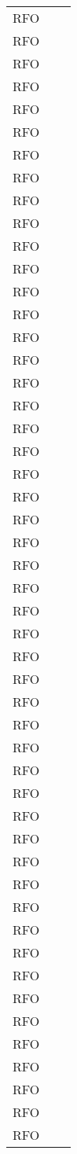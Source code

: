 \begin{table}
\begin{tabularx}{\textwidth}{lXl}
RFO &  & \\
RFO &  & \\
RFO &  & \\
RFO &  & \\
RFO &  & \\
RFO &  & \\
RFO &  & \\
RFO &  & \\
RFO &  & \\
RFO &  & \\
RFO &  & \\
RFO &  & \\
RFO &  & \\
RFO &  & \\
RFO &  & \\
RFO &  & \\
RFO &  & \\
RFO &  & \\
RFO &  & \\
RFO &  & \\
RFO &  & \\
RFO &  & \\
RFO &  & \\
RFO &  & \\
RFO &  & \\
RFO &  & \\
RFO &  & \\
RFO &  & \\
RFO &  & \\
RFO &  & \\
RFO &  & \\
RFO &  & \\
RFO &  & \\
RFO &  & \\
RFO &  & \\
RFO &  & \\
RFO &  & \\
RFO &  & \\
RFO &  & \\
RFO &  & \\
RFO &  & \\
RFO &  & \\
RFO &  & \\
RFO &  & \\
RFO &  & \\
RFO &  & \\
RFO &  & \\
RFO &  & \\
RFO &  & \\
RFO &  & \\

\end{tabularx}
\end{table}
